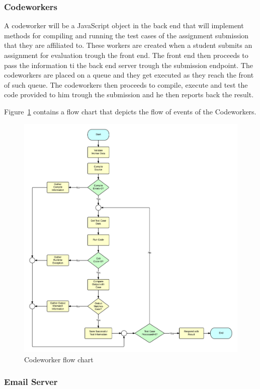\subsubsection{Codeworkers}

A codeworker will be a JavaScript object in the back end that will implement
methods for compiling and running the test cases of the assignment submission
that they are affiliated to. These workers are created when a student submits an
assignment for evaluation trough the front end. The front end then proceeds to
pass the information ti the back end server trough the submission endpoint. The
codeworkers are placed on a queue and they get executed as they reach the front
of such queue. The codeworkers then proceeds to compile, execute and test the
code provided to him trough the submission and he then reports back the result.

Figure~\ref{fig:flow} contains a flow chart that depicts the flow of events of
the Codeworkers.

\begin{figure}[H]
	\centering
	\includegraphics[width=\textwidth]{img/flowchart}
	\caption{Codeworker flow chart\label{fig:flow}}
\end{figure}

\subsubsection{Email Server}

